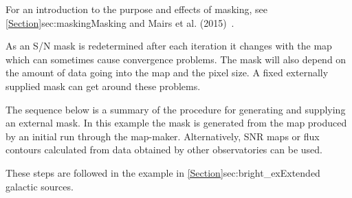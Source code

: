 For an introduction to the purpose and effects of masking, see
\cref{Section}{sec:masking}{Masking} and Mairs et al. (2015)~\cite{extendedrecovery}.

As an S/N mask is redetermined after each iteration it changes with the map
 which can sometimes cause convergence problems. The mask
will also depend on the amount of data going into the map and the
pixel size. A fixed externally supplied mask  can get around these problems.

The sequence below is a summary of the procedure for generating and
supplying an external mask. In this example the mask is generated from
the map produced by an initial run through the map-maker.
Alternatively, SNR maps or flux contours calculated from
data obtained by other observatories can be used.

These steps are followed in the example in
\cref{Section}{sec:bright_ex}{Extended galactic sources}.

